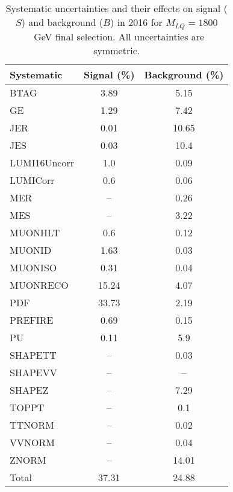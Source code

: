 \begin{table}[htbp]
\begin{center}
\caption{Systematic uncertainties and their effects on signal ($S$) and background ($B$) in 2016 for $M_{LQ}=1800$~GeV final selection. All uncertainties are symmetric.}
\begin{tabular}{lcc}
\hline\hline
Systematic & Signal (\%) & Background (\%) \\ \hline 
BTAG & 3.89 & 5.15\\ 
GE & 1.29 & 7.42\\ 
JER & 0.01 & 10.65\\ 
JES & 0.03 & 10.4\\ 
LUMI16Uncorr & 1.0 & 0.09\\ 
LUMICorr & 0.6 & 0.06\\ 
MER & -- & 0.26\\ 
MES & -- & 3.22\\ 
MUONHLT & 0.6 & 0.12\\ 
MUONID & 1.63 & 0.03\\ 
MUONISO & 0.31 & 0.04\\ 
MUONRECO & 15.24 & 4.07\\ 
PDF & 33.73 & 2.19\\ 
PREFIRE & 0.69 & 0.15\\ 
PU & 0.11 & 5.9\\ 
SHAPETT & -- & 0.03\\ 
SHAPEVV & -- & --\\ 
SHAPEZ & -- & 7.29\\ 
TOPPT & -- & 0.1\\ 
TTNORM & -- & 0.02\\ 
VVNORM & -- & 0.04\\ 
ZNORM & -- & 14.01\\ 
Total & 37.31 & 24.88\\ \hline \hline
\end{tabular}
\label{tab:SysUncertainties_uujj_1800}
\end{center}
\end{table}

